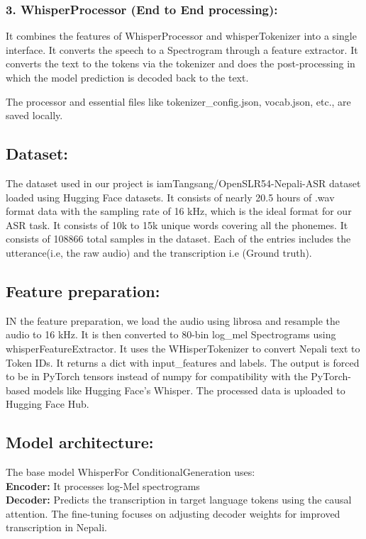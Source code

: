  \subsubsection{3. WhisperProcessor (End to End processing):} 
 It combines the features of WhisperProcessor and whisperTokenizer into a single interface. It converts the speech to a Spectrogram through a feature extractor. It converts the text to the tokens via the tokenizer and does the post-processing in which the model prediction is decoded back to the text.

 The processor and essential files like tokenizer\_config.json, vocab.json, etc., are saved locally. 

 \subsection{Dataset:} The dataset used in our project is iamTangsang/OpenSLR54-Nepali-ASR dataset loaded using Hugging Face datasets. It consists of nearly 20.5 hours of .wav format data with the sampling rate of 16 kHz, which is the ideal format for our ASR task. It consists of 10k to 15k unique words covering all the phonemes. It consists of 108866 total samples in the dataset. Each of the entries includes the utterance(i.e, the raw audio) and the transcription i.e (Ground truth).

\subsection{Feature preparation:} IN the feature preparation, we load the audio using librosa and resample the audio to 16 kHz. It is then converted to 80-bin log\_mel Spectrograms using whisperFeatureExtractor. It uses the WHisperTokenizer to convert Nepali text to Token IDs. It returns a dict with input\_features and labels. The output is forced to be in PyTorch tensors instead of numpy for compatibility with the PyTorch-based models like Hugging Face's Whisper. The processed data is uploaded to Hugging Face Hub.

 \subsection{Model architecture:} The base model WhisperFor ConditionalGeneration uses: \\
 \textbf{Encoder:} It processes log-Mel spectrograms \\
 \textbf{Decoder:} Predicts the transcription in target language tokens using the causal attention. 
 The fine-tuning focuses on adjusting decoder weights for improved transcription in Nepali. \\
